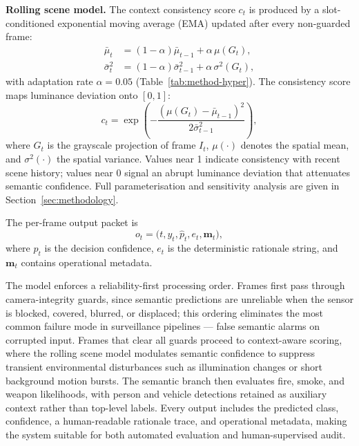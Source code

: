 \documentclass[sensors,article,submit,pdftex,moreauthors]{Definitions/mdpi}
\begin{document}
\textbf{Rolling scene model.}
The context consistency score $c_t$ is produced by a slot-conditioned exponential moving average (EMA) updated after every non-guarded frame:
\begin{equation}
\label{eq:scene-ema-model}
\begin{aligned}
\bar{\mu}_t &= (1-\alpha)\bar{\mu}_{t-1} + \alpha\,\mu(G_t), \\
\bar{\sigma}_t^2 &= (1-\alpha)\bar{\sigma}_{t-1}^2 + \alpha\,\sigma^2(G_t),
\end{aligned}
\end{equation}
with adaptation rate $\alpha = 0.05$ (Table~\ref{tab:method-hyper}). The consistency score maps luminance deviation onto $[0,1]$:
\begin{equation}
\label{eq:ct-model}
c_t = \exp\!\left(-\frac{(\mu(G_t)-\bar{\mu}_{t-1})^2}{2\bar{\sigma}_{t-1}^2}\right),
\end{equation}
where $G_t$ is the grayscale projection of frame $I_t$, $\mu(\cdot)$ denotes the spatial mean, and $\sigma^2(\cdot)$ the spatial variance. Values near 1 indicate consistency with recent scene history; values near 0 signal an abrupt luminance deviation that attenuates semantic confidence. Full parameterisation and sensitivity analysis are given in Section~\ref{sec:methodology}.
 
The per-frame output packet is
\begin{equation}
o_t=\bigl(t,y_t,\hat{p}_t,e_t,\mathbf{m}_t\bigr),
\end{equation}
where $\hat{p}_t$ is the decision confidence, $e_t$ is the deterministic rationale string, and $\mathbf{m}_t$ contains operational metadata.
 
The model enforces a reliability-first processing order. Frames first pass through camera-integrity guards, since semantic predictions are unreliable when the sensor is blocked, covered, blurred, or displaced; this ordering eliminates the most common failure mode in surveillance pipelines — false semantic alarms on corrupted input. Frames that clear all guards proceed to context-aware scoring, where the rolling scene model modulates semantic confidence to suppress transient environmental disturbances such as illumination changes or short background motion bursts. The semantic branch then evaluates fire, smoke, and weapon likelihoods, with person and vehicle detections retained as auxiliary context rather than top-level labels. Every output includes the predicted class, confidence, a human-readable rationale trace, and operational metadata, making the system suitable for both automated evaluation and human-supervised audit.
 
\end{document}
